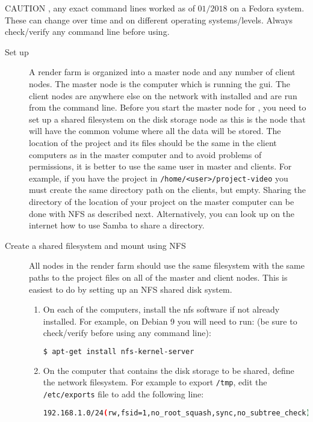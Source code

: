 {\color{red} CAUTION }, any exact command lines worked as of $01/2018$ on a Fedora system.  These can change over time and on different operating systems/levels.  Always check/verify any command line before using.

\begin{description}
    \item[Set up \CGG{}] A \CGG{} render farm is organized into a master node and any number of client nodes.  The master node is the computer which is running the gui.  The client nodes are anywhere else on the network with \CGG{} installed and are run from the command line.  Before you start the master node for \CGG{}, you need to set up a shared filesystem on the disk storage node as this is the node that will have the common volume where all the data will be stored.  
    The location of the project and its files should be the same in the client computers as in the master computer and to avoid problems of permissions, it is better to use the same user in master and clients. 
    For example, if you have the project in \texttt{/home/<user>/project-video} you must create the same directory path on the clients, but empty.  Sharing the directory of the location of your project on the master computer can be done with NFS as described next.  Alternatively, you can look up on the internet how to use Samba to share a directory.
    \item[Create a shared filesystem and mount using NFS] All nodes in the render farm should use the same filesystem with the same paths to the project files on all of the master and client nodes.  This is easiest to do by setting up an NFS shared disk system.
    \begin{enumerate}
        \item On each of the computers, install the nfs software if not already installed.  For example, on Debian 9
        you will need to run: (be sure to check/verify before using any command line):
        \begin{lstlisting}[language=bash,numbers=none]
$ apt-get install nfs-kernel-server
        \end{lstlisting}
        \item On the computer that contains the disk storage to be shared, define the network filesystem.  For
        example to export \texttt{/tmp}, edit the \texttt{/etc/exports} file to add the following line:
        \begin{lstlisting}[language=bash,numbers=none]
192.168.1.0/24(rw,fsid=1,no_root_squash,sync,no_subtree_check)

\end{lstlisting}
\end{enumerate}
\end{description}

